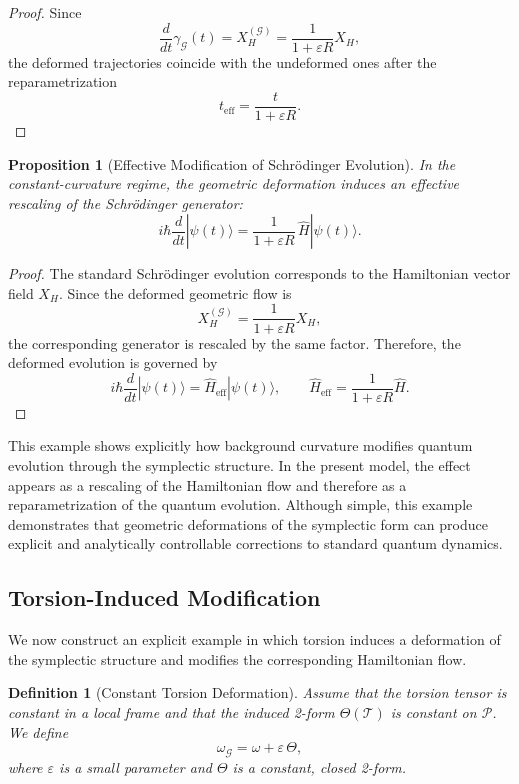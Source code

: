 \documentclass[11pt, a4paper]{article}
\newtheorem{proposition}[theorem]{Proposition}
\newtheorem{definition}[theorem]{Definition}
\begin{document}
\begin{proof}
Since
\[
\frac{d}{dt}\gamma_{\mathcal{G}}(t)
= X_H^{(\mathcal{G})}
= \frac{1}{1+\varepsilon R}X_H,
\]
the deformed trajectories coincide with the undeformed ones after the
reparametrization
\[
t_{\mathrm{eff}} = \frac{t}{1+\varepsilon R}.
\]
\end{proof}

\begin{proposition}[Effective Modification of Schr\"odinger Evolution]
In the constant-curvature regime, the geometric deformation induces an
effective rescaling of the Schr\"odinger generator:
\[
i\hbar \frac{d}{dt} |\psi(t)\rangle
= \frac{1}{1+\varepsilon R}\,\hat{H}|\psi(t)\rangle.
\]
\end{proposition}

\begin{proof}
The standard Schr\"odinger evolution corresponds to the Hamiltonian vector
field $X_H$. Since the deformed geometric flow is
\[
X_H^{(\mathcal{G})} = \frac{1}{1+\varepsilon R}X_H,
\]
the corresponding generator is rescaled by the same factor. Therefore,
the deformed evolution is governed by
\[
i\hbar \frac{d}{dt} |\psi(t)\rangle
= \hat{H}_{\mathrm{eff}} |\psi(t)\rangle,
\qquad
\hat{H}_{\mathrm{eff}} = \frac{1}{1+\varepsilon R}\hat{H}.
\]
\end{proof}

This example shows explicitly how background curvature modifies quantum
evolution through the symplectic structure. In the present model, the effect
appears as a rescaling of the Hamiltonian flow and therefore as a
reparametrization of the quantum evolution. Although simple, this example
demonstrates that geometric deformations of the symplectic form can produce
explicit and analytically controllable corrections to standard quantum
dynamics.





\subsection{Torsion-Induced Modification}

We now construct an explicit example in which torsion induces a deformation
of the symplectic structure and modifies the corresponding Hamiltonian flow.

\begin{definition}[Constant Torsion Deformation]
Assume that the torsion tensor is constant in a local frame and that the
induced 2-form $\Theta(\mathcal{T})$ is constant on $\mathcal{P}$.
We define
\[
\omega_{\mathcal{G}} = \omega + \varepsilon\, \Theta,
\]
where $\varepsilon$ is a small parameter and $\Theta$ is a constant,
closed 2-form.
\end{definition}
\end{document}

